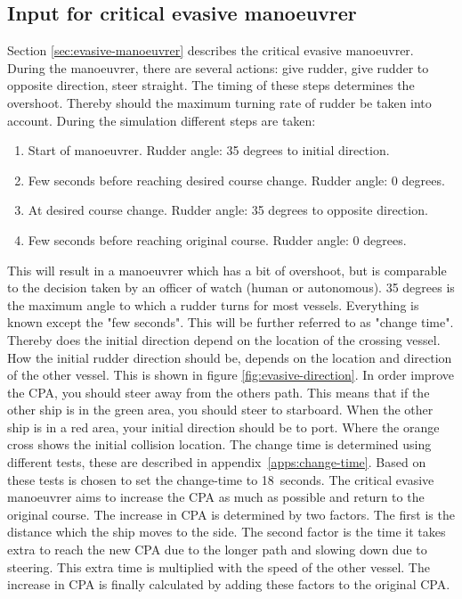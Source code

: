 \subsection{Input for critical evasive manoeuvrer}
Section \ref{sec:evasive-manoeuvrer} describes the critical evasive manoeuvrer. During the manoeuvrer, there are several actions: give rudder, give rudder to opposite direction, steer straight. The timing of these steps determines the overshoot. Thereby should the maximum turning rate of rudder be taken into account.
During the simulation different steps are taken:
\begin{enumerate}
	\item Start of manoeuvrer. Rudder angle: 35 degrees to initial direction.
	\item Few seconds before reaching desired course change. Rudder angle: 0 degrees.
	\item At desired course change. Rudder angle: 35 degrees to opposite direction.
	\item Few seconds before reaching original course. Rudder angle: 0 degrees.
\end{enumerate}
This will result in a manoeuvrer which has a bit of overshoot, but is comparable to the decision taken by an officer of watch (human or autonomous). 35 degrees is the maximum angle to which a rudder turns for most vessels. Everything is known except the "few seconds". This will be further referred to as "change time". Thereby does the initial direction depend on the location of the crossing vessel. How the initial rudder direction should be, depends on the location and direction of the other vessel. This is shown in figure \ref{fig:evasive-direction}. In order improve the CPA, you should steer away from the others path. This means that if the other ship is in the green area, you should steer to starboard. When the other ship is in a red area, your initial direction should be to port. Where the orange cross shows the initial collision location.
The change time is determined using different tests, these are described in appendix~\ref{apps:change-time}. Based on these tests is chosen to set the change-time to 18~seconds.
The critical evasive manoeuvrer aims to increase the \ac{CPA} as much as possible and return to the original course. The increase in \ac{CPA} is determined by two factors. The first is the distance which the ship moves to the side. The second factor is the time it takes extra to reach the new \ac{CPA} due to the longer path and slowing down due to steering. This extra time is multiplied with the speed of the other vessel. The increase in \ac{CPA} is finally calculated by adding these factors to the original \ac{CPA}.

